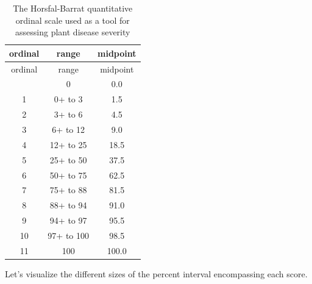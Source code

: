 \documentclass[
  letterpaper,
]{book}
\begin{document}
\hypertarget{tbl-HB}{}
\begin{longtable}[]{@{}ccc@{}}
\caption{\label{tbl-HB}The Horsfal-Barrat quantitative ordinal scale
used as a tool for assessing plant disease severity}\tabularnewline
\toprule\noalign{}
ordinal & range & midpoint \\
\midrule\noalign{}
\endfirsthead
\toprule\noalign{}
ordinal & range & midpoint \\
\midrule\noalign{}
\endhead
\bottomrule\noalign{}
\endlastfoot
0 & 0 & 0.0 \\
1 & 0+ to 3 & 1.5 \\
2 & 3+ to 6 & 4.5 \\
3 & 6+ to 12 & 9.0 \\
4 & 12+ to 25 & 18.5 \\
5 & 25+ to 50 & 37.5 \\
6 & 50+ to 75 & 62.5 \\
7 & 75+ to 88 & 81.5 \\
8 & 88+ to 94 & 91.0 \\
9 & 94+ to 97 & 95.5 \\
10 & 97+ to 100 & 98.5 \\
11 & 100 & 100.0 \\
\end{longtable}

Let's visualize the different sizes of the percent interval encompassing
each score.
\end{document}
